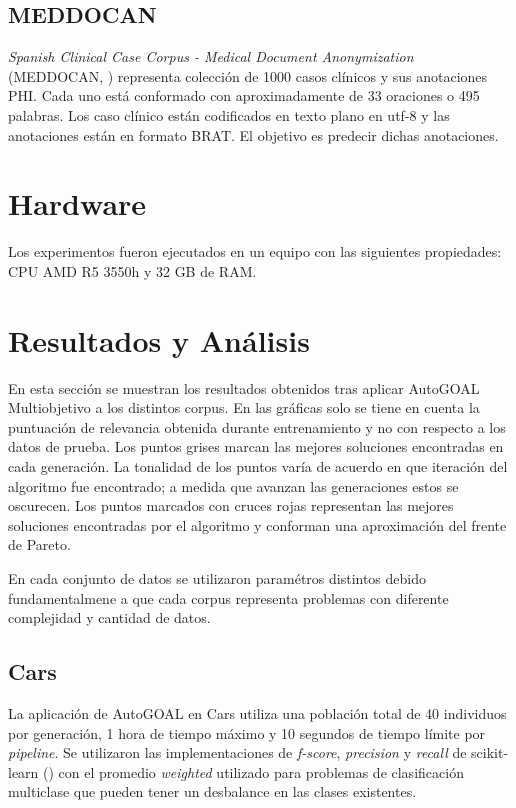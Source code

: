 \subsection{MEDDOCAN}

\textit{Spanish Clinical Case Corpus - Medical Document Anonymization} (MEDDOCAN, \cite{marimon2019automatic}) representa colecci\'on de 1000 casos cl\'inicos y sus anotaciones PHI. Cada uno est\'a conformado con aproximadamente de 33 oraciones o 495 palabras. Los caso cl\'inico est\'an codificados en texto plano en utf-8 y las anotaciones est\'an en formato BRAT. El objetivo es predecir dichas anotaciones.

\section{Hardware}
 Los experimentos fueron ejecutados en un equipo con las siguientes propiedades: CPU AMD R5 3550h y 32 GB de RAM.

\section{Resultados y An\'alisis}

En esta secci\'on se muestran los resultados obtenidos tras aplicar AutoGOAL Multiobjetivo a los distintos corpus. En las gr\'aficas solo se tiene en cuenta la puntuaci\'on de relevancia obtenida durante entrenamiento y no con respecto a los datos de prueba. Los puntos  grises marcan las mejores soluciones encontradas en cada generaci\'on.  La tonalidad de los puntos var\'ia de acuerdo en que iteraci\'on del algoritmo fue encontrado; a medida que avanzan las generaciones estos se oscurecen. Los puntos marcados con cruces rojas representan las mejores soluciones encontradas por el algoritmo y conforman una aproximaci\'on del frente de Pareto.

En cada conjunto de datos se utilizaron param\'etros distintos debido fundamentalmene a que cada corpus representa problemas con diferente complejidad y cantidad de datos.

\subsection{Cars}
La aplicaci\'on de AutoGOAL en Cars utiliza una poblaci\'on total de 40 individuos por generaci\'on, 1 hora de tiempo m\'aximo y 10 segundos de tiempo l\'imite por \textit{pipeline}. Se utilizaron las implementaciones de \textit{f-score}, \textit{precision} y \textit{recall} de scikit-learn (\cite{pedregosa2011scikit}) con el promedio \textit{weighted} utilizado para problemas de clasificaci\'on multiclase que pueden tener un desbalance en las clases existentes.

